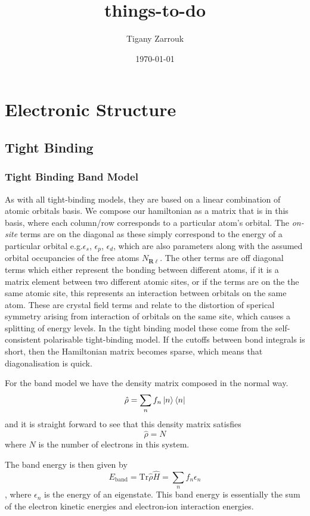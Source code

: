 \documentclass[11pt]{article}
\author{Tigany Zarrouk}
\date{\today}
\title{things-to-do}
\begin{document}
\maketitle
\tableofcontents

\section{Electronic Structure}
\label{sec-1}
\subsection{Tight Binding}
\label{sec-1-1}
\subsubsection{Tight Binding Band Model}
\label{sec-1-1-1}

As with all tight-binding models, they are based on a linear combination of atomic orbitals basis. 
We compose our hamiltonian as a matrix that is in this basis, where each column/row corresponds to a particular
atom's orbital.
The \emph{on-site} terms are on the diagonal as these simply correspond to the energy of a particular orbital
e.g.$\epsilon_s$, $\epsilon_p$, $\epsilon_d$, which are also parameters along with the assumed orbital occupancies 
of the free atoms $N_{\mathbf{R}\ell}$.
The other terms are off diagonal terms which either represent the bonding between different atoms, if it is a matrix element
between two different atomic sites, or if the terms are on the the same atomic site, this represents an interaction
between orbitals on the same atom. These are crystal field terms and relate to the distortion of sperical symmetry arising from
interaction of orbitals on the same site, which causes a splitting of energy levels. 
In the tight binding model these come from the self-consistent polarisable tight-binding 
model. If the cutoffs between bond integrals is short, then the Hamiltonian matrix becomes sparse, 
which means that diagonalisation is quick. 

For the band model we have the density matrix composed in the normal way. 
$$ \hat{\rho} = \sum_{n} f_{n} \ket{n} \bra{n}$$ and it is straight forward to see that this density matrix satisfies 
$$ \hat{\rho} = N $$ where $N$ is the number of electrons in this system. 

The band energy is then given by $$E_{\text{band}} = \text{Tr}\hat{\rho}\hat{H} = \sum_{n} f_{n}\epsilon_{n} $$, where $\epsilon_{n}$
is the energy of an eigenstate. This band energy is essentially the sum of the electron kinetic energies and electron-ion interaction energies. 
\end{document}
